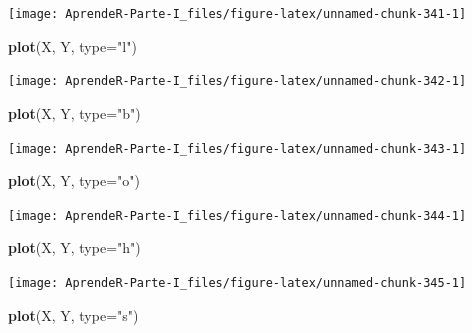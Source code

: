 \documentclass[]{book}
\newenvironment{Shaded}{\begin{snugshade}}{\end{snugshade}}
\newcommand{\DataTypeTok}[1]{\textcolor[rgb]{0.13,0.29,0.53}{#1}}
\newcommand{\KeywordTok}[1]{\textcolor[rgb]{0.13,0.29,0.53}{\textbf{#1}}}
\newcommand{\NormalTok}[1]{#1}
\newcommand{\StringTok}[1]{\textcolor[rgb]{0.31,0.60,0.02}{#1}}
\theoremstyle{definition}
\theoremstyle{definition}
\theoremstyle{definition}
\theoremstyle{remark}
\begin{document}
\begin{center}\texttt{[image: AprendeR-Parte-I\_files/figure-latex/unnamed-chunk-341-1]} \end{center}

\begin{Shaded}
\begin{Highlighting}[]
\KeywordTok{plot}\NormalTok{(X, Y, }\DataTypeTok{type=}\StringTok{"l"}\NormalTok{)}
\end{Highlighting}
\end{Shaded}

\begin{center}\texttt{[image: AprendeR-Parte-I\_files/figure-latex/unnamed-chunk-342-1]} \end{center}

\begin{Shaded}
\begin{Highlighting}[]
\KeywordTok{plot}\NormalTok{(X, Y, }\DataTypeTok{type=}\StringTok{"b"}\NormalTok{)}
\end{Highlighting}
\end{Shaded}

\begin{center}\texttt{[image: AprendeR-Parte-I\_files/figure-latex/unnamed-chunk-343-1]} \end{center}

\begin{Shaded}
\begin{Highlighting}[]
\KeywordTok{plot}\NormalTok{(X, Y, }\DataTypeTok{type=}\StringTok{"o"}\NormalTok{)}
\end{Highlighting}
\end{Shaded}

\begin{center}\texttt{[image: AprendeR-Parte-I\_files/figure-latex/unnamed-chunk-344-1]} \end{center}

\begin{Shaded}
\begin{Highlighting}[]
\KeywordTok{plot}\NormalTok{(X, Y, }\DataTypeTok{type=}\StringTok{"h"}\NormalTok{)}
\end{Highlighting}
\end{Shaded}

\begin{center}\texttt{[image: AprendeR-Parte-I\_files/figure-latex/unnamed-chunk-345-1]} \end{center}

\begin{Shaded}
\begin{Highlighting}[]
\KeywordTok{plot}\NormalTok{(X, Y, }\DataTypeTok{type=}\StringTok{"s"}\NormalTok{)}
\end{Highlighting}
\end{Shaded}
\end{document}
